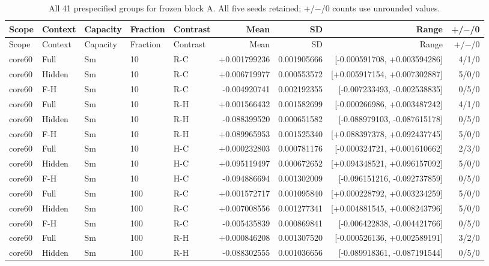 \begingroup\scriptsize
\setlength{\tabcolsep}{3pt}
\begin{longtable}{lllllrrrr}
\caption{All 41 prespecified groups for frozen block A. All five seeds retained; +/$-$/0 counts use unrounded values.}\label{tab:confirmation-a-complete}\\
\toprule
Scope & Context & Capacity & Fraction & Contrast & Mean & SD & Range & +/$-$/0 \\
\midrule\endfirsthead
\toprule
Scope & Context & Capacity & Fraction & Contrast & Mean & SD & Range & +/$-$/0 \\
\midrule\endhead
\bottomrule\endfoot
core60 & Full & Sm & 10 & R-C & +0.001799236 & 0.001905666 & [-0.000591708, +0.003594286] & 4/1/0 \\
core60 & Hidden & Sm & 10 & R-C & +0.006719977 & 0.000553572 & [+0.005917154, +0.007302887] & 5/0/0 \\
core60 & F-H & Sm & 10 & R-C & -0.004920741 & 0.002192355 & [-0.007233493, -0.002538835] & 0/5/0 \\
core60 & Full & Sm & 10 & R-H & +0.001566432 & 0.001582699 & [-0.000266986, +0.003487242] & 4/1/0 \\
core60 & Hidden & Sm & 10 & R-H & -0.088399520 & 0.000651582 & [-0.088979103, -0.087615178] & 0/5/0 \\
core60 & F-H & Sm & 10 & R-H & +0.089965953 & 0.001525340 & [+0.088397378, +0.092437745] & 5/0/0 \\
core60 & Full & Sm & 10 & H-C & +0.000232803 & 0.000781176 & [-0.000324721, +0.001610662] & 2/3/0 \\
core60 & Hidden & Sm & 10 & H-C & +0.095119497 & 0.000672652 & [+0.094348521, +0.096157092] & 5/0/0 \\
core60 & F-H & Sm & 10 & H-C & -0.094886694 & 0.001302009 & [-0.096151216, -0.092737859] & 0/5/0 \\
core60 & Full & Sm & 100 & R-C & +0.001572717 & 0.001095840 & [+0.000228792, +0.003234259] & 5/0/0 \\
core60 & Hidden & Sm & 100 & R-C & +0.007008556 & 0.001277341 & [+0.004881545, +0.008243796] & 5/0/0 \\
core60 & F-H & Sm & 100 & R-C & -0.005435839 & 0.000869841 & [-0.006422838, -0.004421766] & 0/5/0 \\
core60 & Full & Sm & 100 & R-H & +0.000846208 & 0.001307520 & [-0.000526136, +0.002589191] & 3/2/0 \\
core60 & Hidden & Sm & 100 & R-H & -0.088302555 & 0.001036656 & [-0.089918361, -0.087191544] & 0/5/0 \\

\end{longtable}
